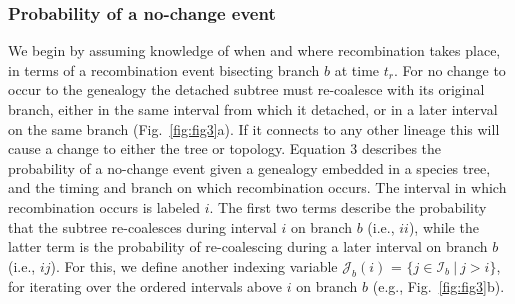 \documentclass[11pt]{article}
\begin{document}
\subsubsection{Probability of a no-change event}
We begin by assuming knowledge of when and where recombination takes place, in terms 
of a recombination event bisecting branch $b$ at time $t_r$. %
For no change to occur to the genealogy the detached subtree must re-coalesce with 
its original branch, either in the same interval from which it detached, or in a
later interval on the same branch (Fig.~\ref{fig:fig3}a). %
If it connects to any other lineage this will cause a change to either the tree 
or topology. 
Equation 3 describes the probability of a no-change event 
given a genealogy embedded in a species tree, and the timing and branch on 
which recombination occurs. The interval in which recombination occurs 
is labeled $i$. 
The first two terms describe the probability that the subtree re-coalesces 
during interval $i$ on branch $b$ (i.e., $ii$), 
while the latter term is the probability of re-coalescing
during a later interval on branch $b$ (i.e., $ij$). For this, we define 
another indexing variable $\mathcal{J}_b(i)$ = $\{j \in \mathcal{I}_b ~|~ j > i\}$, 
for iterating over the ordered intervals above $i$ on branch $b$ (e.g., Fig.~\ref{fig:fig3}b).
\end{document}
